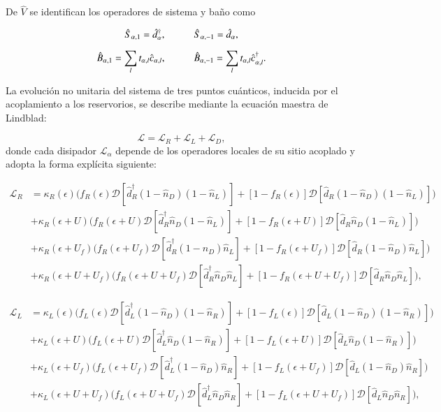 De $\hat{V}$ se identifican los operadores de sistema y baño como 

\begin{equation*}
    \hat{S}_{\alpha,1} = \hat{d}^{\dagger}_{\alpha}, \hspace{10mm} \hat{S}_{\alpha,-1} = \hat{d}_{\alpha},
\end{equation*}

\begin{equation*}
    \hat{B}_{\alpha,1} = \sum_{l}t_{\alpha,l} \hat{c}_{\alpha,l}, \hspace{10mm} \hat{B}_{\alpha,-1} = \sum_{l}t_{\alpha,l} \hat{c}^{\dagger}_{\alpha,l}.
\end{equation*}

La evolución no unitaria del sistema de tres puntos cuánticos, inducida por el acoplamiento a los reservorios, se describe mediante la ecuación maestra de Lindblad:  

\begin{equation}
    \mathcal{L} = \mathcal{L}_{R} + \mathcal{L}_{L} + \mathcal{L}_{D},
    \label{Lindbladsec5}
\end{equation}
donde cada disipador $\mathcal{L}_\alpha$ depende de los operadores locales de su sitio acoplado y adopta la forma explícita siguiente:

\begin{align*}
\mathcal{L}_R &= \kappa_R(\epsilon)\big( f_R(\epsilon)\mathcal{D}[\hat{d}^\dagger_R(1-\hat{n}_D)(1-\hat{n}_L)] + [1-f_R(\epsilon)]\mathcal{D}[\hat{d}_R(1-\hat{n}_D)(1-\hat{n}_L)] \big) \\
&+ \kappa_R(\epsilon+U)\big( f_R(\epsilon+U)\mathcal{D}[\hat{d}^\dagger_R\hat{n}_D(1-\hat{n}_L)] + [1-f_R(\epsilon+U)]\mathcal{D}[\hat{d}_R\hat{n}_D(1-\hat{n}_L)] \big) \\
&+ \kappa_R(\epsilon+U_f)\big( f_R(\epsilon+U_f)\mathcal{D}[\hat{d}^\dagger_R(1-\hat{n}_D)\hat{n}_L] + [1-f_R(\epsilon+U_f)]\mathcal{D}[\hat{d}_R(1-\hat{n}_D)\hat{n}_L] \big) \\
&+ \kappa_R(\epsilon+U+U_f)\big( f_R(\epsilon+U+U_f)\mathcal{D}[\hat{d}^\dagger_R\hat{n}_D\hat{n}_L] + [1-f_R(\epsilon+U+U_f)]\mathcal{D}[\hat{d}_R\hat{n}_D\hat{n}_L] \big),
\end{align*}

\begin{align*}
\mathcal{L}_L &= \kappa_L(\epsilon)\big( f_L(\epsilon)\mathcal{D}[\hat{d}^\dagger_L(1-\hat{n}_D)(1-\hat{n}_R)] + [1-f_L(\epsilon)]\mathcal{D}[\hat{d}_L(1-\hat{n}_D)(1-\hat{n}_R)] \big) \\
&+ \kappa_L(\epsilon+U)\big( f_L(\epsilon+U)\mathcal{D}[\hat{d}^\dagger_L\hat{n}_D(1-\hat{n}_R)] + [1-f_L(\epsilon+U)]\mathcal{D}[\hat{d}_L\hat{n}_D(1-\hat{n}_R)] \big) \\
&+ \kappa_L(\epsilon+U_f)\big( f_L(\epsilon+U_f)\mathcal{D}[\hat{d}^\dagger_L(1-\hat{n}_D)\hat{n}_R] + [1-f_L(\epsilon+U_f)]\mathcal{D}[\hat{d}_L(1-\hat{n}_D)\hat{n}_R] \big) \\
&+ \kappa_L(\epsilon+U+U_f)\big( f_L(\epsilon+U+U_f)\mathcal{D}[\hat{d}^\dagger_L\hat{n}_D\hat{n}_R] + [1-f_L(\epsilon+U+U_f)]\mathcal{D}[\hat{d}_L\hat{n}_D\hat{n}_R] \big),
\end{align*}

